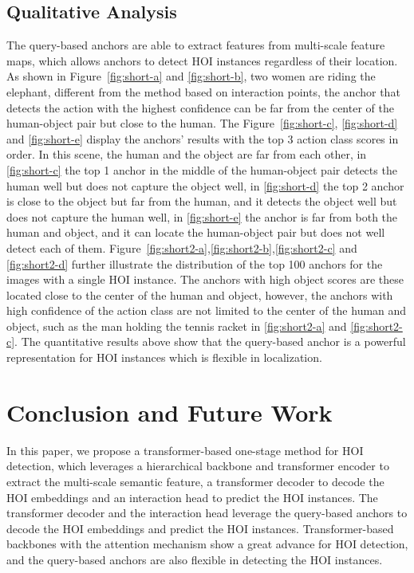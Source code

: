\documentclass[10pt,twocolumn,letterpaper]{article}
\begin{document}
\subsection{Qualitative Analysis}
\space The query-based anchors are able to extract features from multi-scale feature maps, which allows anchors to detect HOI instances regardless of their location.
As shown in Figure~\ref{fig:short-a} and \ref{fig:short-b}, two women are riding the elephant, different from the method based on interaction points,
the anchor that detects the action with the highest confidence can be far from the center of the human-object pair but close to the human.
The Figure~\ref{fig:short-c}, \ref{fig:short-d} and \ref{fig:short-e} display the anchors' results with the top 3 action class scores in order. 
In this scene, the human and the object are far from each other, in \ref{fig:short-c} the top 1 anchor in the middle of the human-object pair detects the human well but does not capture the object well,
in \ref{fig:short-d} the top 2 anchor is close to the object but far from the human, and it detects the object well but does not capture the human well,
in \ref{fig:short-e} the anchor is far from both the human and object, and it can locate the human-object pair but does not well detect each of them.
Figure~\ref{fig:short2-a},\ref{fig:short2-b},\ref{fig:short2-c} and \ref{fig:short2-d} further illustrate the distribution of the top 100 anchors for the images with a single HOI instance.
The anchors with high object scores are these located close to the center of the human and object,
however, the anchors with high confidence of the action class are not limited to the center of the human and object, such as the man holding the tennis racket in \ref{fig:short2-a} and \ref{fig:short2-c}.
The quantitative results above show that the query-based anchor is a powerful representation for HOI instances which is flexible in localization.

\section{Conclusion and Future Work}
In this paper, we propose a transformer-based one-stage method for HOI detection,
which leverages a hierarchical backbone and transformer encoder to extract the multi-scale semantic feature,
a transformer decoder to decode the HOI embeddings and an interaction head to predict the HOI instances.
The transformer decoder and the interaction head leverage the query-based anchors to decode the HOI embeddings and predict the HOI instances.
Transformer-based backbones with the attention mechanism show a great advance for HOI detection, and the query-based anchors are also flexible in detecting the HOI instances.
\end{document}
